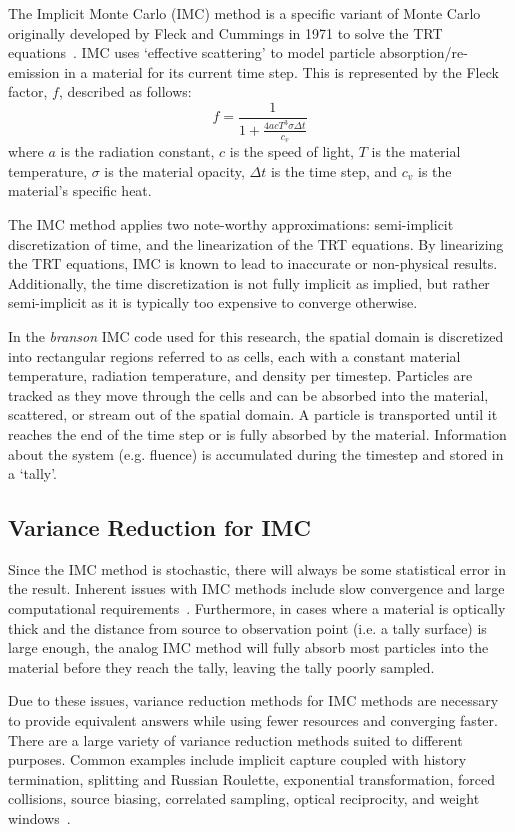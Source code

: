 \documentclass[]{article}
\begin{document}
		The Implicit Monte Carlo (IMC) method is a specific variant of Monte Carlo originally developed by Fleck and Cummings in 1971 to solve the TRT equations~\cite{FC71}. IMC uses `effective scattering' to model particle absorption/re-emission in a material for its current time step. This is represented by the Fleck factor, $f$, described as follows:
		\begin{equation}
			f = \frac{1}{1 + \frac{4acT^{3}\sigma \Delta t}{c_{v}}}
		\end{equation}
		where $a$ is the radiation constant, $c$ is the speed of light, $T$ is the material temperature, $\sigma$ is the material opacity, $\Delta t$ is the time step, and $c_{v}$ is the material's specific heat.

		The IMC method applies two note-worthy approximations: semi-implicit discretization of time, and the linearization of the TRT equations. By linearizing the TRT equations, IMC is known to lead to inaccurate or non-physical results. Additionally, the time discretization is not fully implicit as implied, but rather semi-implicit as it is typically too expensive to converge otherwise.

	    In the \textit{branson} IMC code used for this research, the spatial domain is discretized into rectangular regions referred to as cells, each with a constant material temperature, radiation temperature, and density per timestep. Particles are tracked as they move through the cells and can be absorbed into the material, scattered, or stream out of the spatial domain. A particle is transported until it reaches the end of the time step or is fully absorbed by the material. Information about the system (e.g. fluence) is accumulated during the timestep and stored in a `tally'.

	\subsection{Variance Reduction for IMC} \label{Sec: variance reduction}
		Since the IMC method is stochastic, there will always be some statistical error in the result. Inherent issues with IMC methods include slow convergence and large computational requirements~\cite{AW16}. Furthermore, in cases where a material is optically thick and the distance from source to observation point (i.e. a tally surface) is large enough, the analog IMC method will fully absorb most particles into the material before they reach the tally, leaving the tally poorly sampled.

		Due to these issues, variance reduction methods for IMC methods are necessary to provide equivalent answers while using fewer resources and converging faster. There are a large variety of variance reduction methods suited to different purposes. Common examples include implicit capture coupled with history termination, splitting and Russian Roulette, exponential transformation, forced collisions, source biasing, correlated sampling, optical reciprocity, and weight windows~\cite{JL16}.
\end{document}
